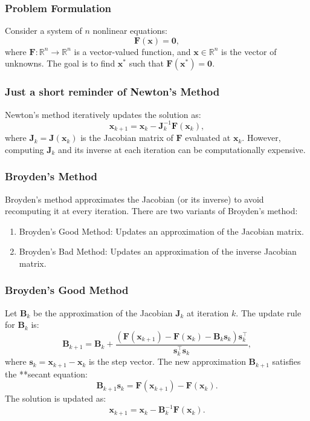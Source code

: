\documentclass{beamer}
\begin{document}
\begin{frame}
\frametitle{Problem Formulation}

Consider a system of \( n \) nonlinear equations:
\[
\mathbf{F}(\mathbf{x}) = \mathbf{0},
\]
where \( \mathbf{F}: \mathbb{R}^n \to \mathbb{R}^n \) is a vector-valued function, and \( \mathbf{x} \in \mathbb{R}^n \) is the vector of unknowns. The goal is to find \( \mathbf{x}^* \) such that \( \mathbf{F}(\mathbf{x}^*) = \mathbf{0} \).
\end{frame}

\begin{frame}
\frametitle{Just a short reminder of Newton’s Method}

Newton’s method iteratively updates the solution as:
\[
\mathbf{x}_{k+1} = \mathbf{x}_k - \mathbf{J}_k^{-1} \mathbf{F}(\mathbf{x}_k),
\]
where \( \mathbf{J}_k = \mathbf{J}(\mathbf{x}_k) \) is the Jacobian matrix of \( \mathbf{F} \) evaluated at \( \mathbf{x}_k \). However, computing \( \mathbf{J}_k \) and its inverse at each iteration can be computationally expensive.
\end{frame}

\begin{frame}
\frametitle{Broyden’s Method}

Broyden’s method approximates the Jacobian (or its inverse) to avoid recomputing it at every iteration. There are two variants of Broyden’s method:
\begin{enumerate}
\item Broyden’s Good Method: Updates an approximation of the Jacobian matrix.

\item Broyden’s Bad Method: Updates an approximation of the inverse Jacobian matrix.
\end{enumerate}

\noindent
\end{frame}

\begin{frame}
\frametitle{Broyden’s Good Method}

Let \( \mathbf{B}_k \) be the approximation of the Jacobian \( \mathbf{J}_k \) at iteration \( k \). The update rule for \( \mathbf{B}_k \) is:
\[
\mathbf{B}_{k+1} = \mathbf{B}_k + \frac{(\mathbf{F}(\mathbf{x}_{k+1}) - \mathbf{F}(\mathbf{x}_k) - \mathbf{B}_k \mathbf{s}_k) \mathbf{s}_k^\top}{\mathbf{s}_k^\top \mathbf{s}_k},
\]
where \( \mathbf{s}_k = \mathbf{x}_{k+1} - \mathbf{x}_k \) is the step vector. The new approximation \( \mathbf{B}_{k+1} \) satisfies the **secant equation:
\[
\mathbf{B}_{k+1} \mathbf{s}_k = \mathbf{F}(\mathbf{x}_{k+1}) - \mathbf{F}(\mathbf{x}_k).
\]
The solution is updated as:
\[
\mathbf{x}_{k+1} = \mathbf{x}_k - \mathbf{B}_k^{-1} \mathbf{F}(\mathbf{x}_k).
\]
\end{frame}
\end{document}
